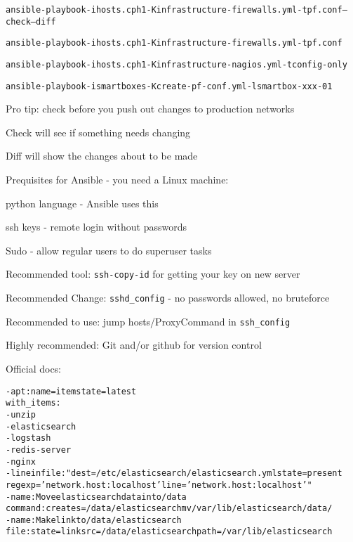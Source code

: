 \documentclass[Screen16to9,17pt]{foils}
\begin{document}

\begin{alltt}\footnotesize
ansible-playbook -i hosts.cph1 -K infrastructure-firewalls.yml -t pf.conf --check --diff

ansible-playbook -i hosts.cph1 -K infrastructure-firewalls.yml -t pf.conf

ansible-playbook -i hosts.cph1 -K infrastructure-nagios.yml -t config-only

ansible-playbook -i smartboxes -K create-pf-conf.yml -l smartbox-xxx-01
\end{alltt}

\begin{list2}
\item Pro tip: check before you push out changes to production networks \smiley
\item Check will see if something needs changing
\item Diff will show the changes about to be made
\end{list2}





Prequisites for Ansible - you need a Linux machine:
\begin{list2}
\item python language - Ansible uses this
\item ssh keys - remote login without passwords
\item Sudo - allow regular users to do superuser tasks
\item Recommended tool: \verb+ssh-copy-id+ for getting your key on new server
\item Recommended Change: \verb+sshd_config+ - no passwords allowed, no bruteforce
\item Recommended to use: jump hosts/ProxyCommand in \verb+ssh_config+
\item Highly recommended: Git and/or github for version control
\end{list2}

Official docs:\\




\begin{alltt}\small
- apt: name={{ item }} state=latest
  with_items:
        - unzip
        - elasticsearch
        - logstash
        - redis-server
        - nginx
- lineinfile: "dest=/etc/elasticsearch/elasticsearch.yml state=present
  regexp='network.host: localhost' line='network.host: localhost'"
- name: Move elasticsearch data into /data
  command: creates=/data/elasticsearch mv /var/lib/elasticsearch /data/
- name: Make link to /data/elasticsearch
  file: state=link src=/data/elasticsearch path=/var/lib/elasticsearch
\end{alltt}
\end{document}
